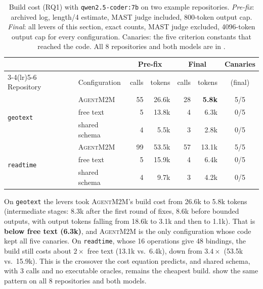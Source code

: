 \documentclass[10pt,a4paper]{article}
\newcommand{\tool}{\textsc{AgentM2M}}
\theoremstyle{definition}
\begin{document}
\begin{table}[h]
\centering\small
\caption{Build cost (RQ1) with \texttt{qwen2.5-coder:7b} on two example
repositories. \emph{Pre-fix}: archived log, length/4 estimate, MAST judge
included, 800-token output cap. \emph{Final}: all levers of this section,
exact counts, MAST judge excluded, 4096-token output cap for every
configuration. Canaries: the five criterion constants that reached the code.
All 8 repositories and both models are in .}
\label{tab:tokens}
\begin{tabular}{@{}l l r r r r c@{}}
\toprule
& & \multicolumn{2}{c}{Pre-fix} & \multicolumn{2}{c}{Final} & Canaries \\
\cmidrule(lr){3-4}\cmidrule(lr){5-6}
Repository & Configuration & calls & tokens & calls & tokens & (final) \\
\midrule
\multirow{3}{*}{\texttt{geotext}} & \tool{} & 55 & 26.6k & 28 & \textbf{5.8k} & 5/5 \\
 & free text & 5 & 13.8k & 4 & 6.3k & 0/5 \\
 & shared schema & 4 & 5.5k & 3 & 2.8k & 0/5 \\
\midrule
\multirow{3}{*}{\texttt{readtime}} & \tool{} & 99 & 53.5k & 57 & 13.1k & 5/5 \\
 & free text & 5 & 15.9k & 4 & 6.4k & 0/5 \\
 & shared schema & 4 & 9.7k & 3 & 4.2k & 0/5 \\
\bottomrule
\end{tabular}
\end{table}

\noindent On \texttt{geotext} the levers took \tool{}'s build cost from 26.6k
to 5.8k tokens (intermediate stages: 8.3k after the first round of fixes,
8.6k before bounded outputs, with output tokens falling from 18.6k to 3.1k
and then to 1.1k). That is \textbf{below free text (6.3k)}, and \tool{} is
the only configuration whose code kept all five canaries. On
\texttt{readtime}, whose 16 operations give 48 bindings, the build still
costs about $2\times$ free text (13.1k vs.\ 6.4k), down from $3.4\times$
(53.5k vs.\ 15.9k). This is the crossover the cost equation predicts, and
shared schema, with 3 calls and no executable oracles, remains the cheapest
build.  show the same pattern on all 8
repositories and both models.
\end{document}

